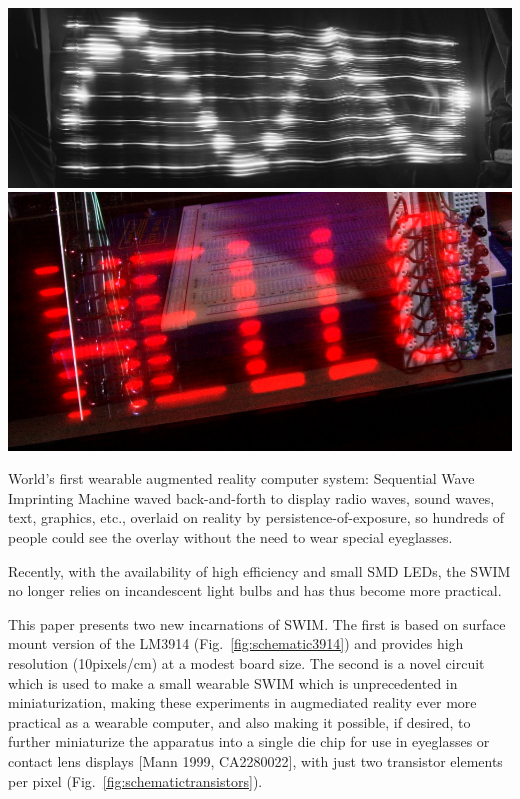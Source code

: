 \documentclass{sigchi-ext}
\begin{document}
\begin{marginfigure}[-25pc]
\begin{minipage}{\marginparwidth}
 \includegraphics[width=.8\textwidth]{SittingWaveTwoCycles4crop.jpg}
 \includegraphics[width=.8\textwidth]{hello2cropcrop.jpg}
    \centering
    \caption{
             World's first wearable augmented reality computer system:
             Sequential Wave Imprinting Machine waved back-and-forth
             to display
             radio waves, sound waves, text, graphics, etc.,
             overlaid on reality by persistence-of-exposure,
             so hundreds of people could see the
             overlay without the need to wear special eyeglasses.
            }
    \label{fig:swim74}
  \end{minipage}
\end{marginfigure}
Recently, with the availability of high efficiency and small SMD LEDs, the SWIM
no longer relies on incandescent light bulbs and has thus become more
practical.

This paper presents two new incarnations of SWIM. The first is based on
surface mount version of the
LM3914 (Fig.~\ref{fig:schematic3914})
and provides high resolution (10pixels/cm) at a modest
board size. The second is a novel circuit which is used to make a small
wearable SWIM which is unprecedented in miniaturization,
making these experiments in augmediated reality ever more practical
as a wearable computer, and also making it possible, if desired, to
further miniaturize the apparatus into a single die chip for use in eyeglasses
or contact lens displays [Mann 1999, CA2280022],
with just two transistor elements per pixel
(Fig.~\ref{fig:schematictransistors}).

\end{document}
